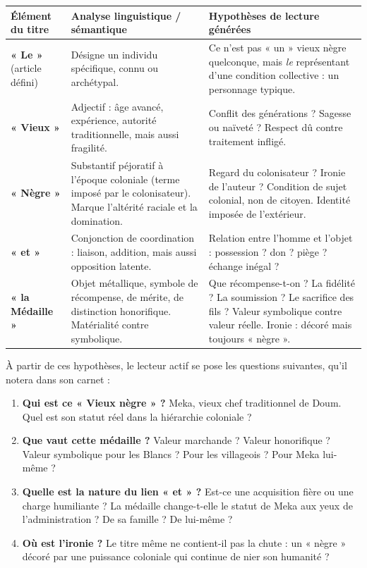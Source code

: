 \documentclass[11pt]{article}
\begin{document}
\begin{center}
\begin{tabularx}{\linewidth}{|l|X|X|}
\hline
\textbf{Élément du titre} & \textbf{Analyse linguistique / sémantique} & \textbf{Hypothèses de lecture générées} \\
\hline
\textbf{« Le »} (article défini) & Désigne un individu spécifique, connu ou archétypal. & Ce n'est pas « un » vieux nègre quelconque, mais \emph{le} représentant d'une condition collective : un personnage typique. \\
\hline
\textbf{« Vieux »} & Adjectif : âge avancé, expérience, autorité traditionnelle, mais aussi fragilité. & Conflit des générations ? Sagesse ou naïveté ? Respect dû contre traitement infligé. \\
\hline
\textbf{« Nègre »} & Substantif péjoratif à l'époque coloniale (terme imposé par le colonisateur). Marque l'altérité raciale et la domination. & Regard du colonisateur ? Ironie de l'auteur ? Condition de sujet colonial, non de citoyen. Identité imposée de l'extérieur. \\
\hline
\textbf{« et »} & Conjonction de coordination : liaison, addition, mais aussi opposition latente. & Relation entre l'homme et l'objet : possession ? don ? piège ? échange inégal ? \\
\hline
\textbf{« la Médaille »} & Objet métallique, symbole de récompense, de mérite, de distinction honorifique. Matérialité contre symbolique. & Que récompense-t-on ? La fidélité ? La soumission ? Le sacrifice des fils ? Valeur symbolique contre valeur réelle. Ironie : décoré mais toujours « nègre ». \\
\hline
\end{tabularx}
\end{center}

\begin{exemplebox}
À partir de ces hypothèses, le lecteur actif se pose les questions suivantes, qu'il notera dans son carnet :
\begin{enumerate}
    \item \textbf{Qui est ce « Vieux nègre » ?} Meka, vieux chef traditionnel de Doum. Quel est son statut réel dans la hiérarchie coloniale ?
    \item \textbf{Que vaut cette médaille ?} Valeur marchande ? Valeur honorifique ? Valeur symbolique pour les Blancs ? Pour les villageois ? Pour Meka lui-même ?
    \item \textbf{Quelle est la nature du lien « et » ?} Est-ce une acquisition fière ou une charge humiliante ? La médaille change-t-elle le statut de Meka aux yeux de l'administration ? De sa famille ? De lui-même ?
    \item \textbf{Où est l'ironie ?} Le titre même ne contient-il pas la chute : un « nègre » décoré par une puissance coloniale qui continue de nier son humanité ?
\end{enumerate}
\end{exemplebox}
\end{document}
